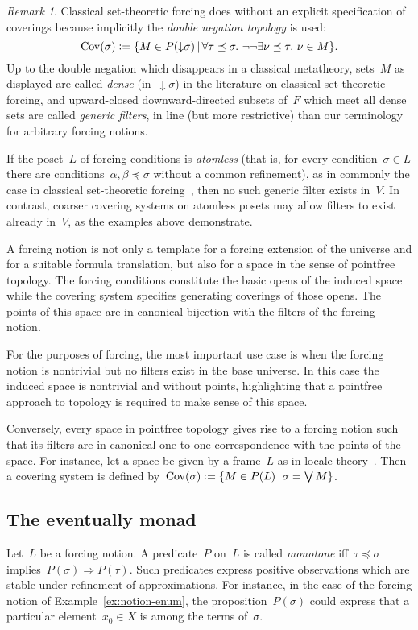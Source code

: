 \documentclass[com,11pt,crcready]{iosart2x}
\theoremstyle{definition}
\theoremstyle{plain}
\theoremstyle{remark}
\newtheorem{remark}[definition]{Remark}
\newcommand{\?}{\,{:}\,}
\newcommand{\defeq}{\vcentcolon=}
\newcommand{\Cov}{\mathrm{Cov}}
\renewcommand{\_}{\mathpunct{.}\,}
\begin{document}
\begin{remark}Classical set-theoretic forcing
does without an explicit specification of coverings because implicitly the
\emph{double negation topology} is used:
\[ \Cov(\sigma) \defeq \{ M \in P({\downarrow}\sigma) \,|\,
  \forall \tau \preceq \sigma\_ \neg\neg \exists \nu \preceq \tau\_ \nu \in M
  \}. \]
Up to the double negation which disappears in a classical metatheory, sets~$M$ as displayed are called
\emph{dense} (in~${\downarrow}\sigma$) in the literature on classical set-theoretic forcing, and
upward-closed downward-directed subsets of~$F$ which meet all dense sets are
called \emph{generic filters}, in line (but more restrictive) than our
terminology for arbitrary forcing notions.

If the poset~$L$ of forcing conditions is \emph{atomless} (that is, for every
condition~$\sigma \in L$ there are conditions~$\alpha,\beta \preceq \sigma$
without a common refinement), as in commonly the case in classical
set-theoretic forcing~\cite[Lemma~1.33]{schilhan:bsc}, then no such generic filter exists in~$V$.
In contrast, coarser covering systems on atomless posets may allow
filters to exist already in~$V$, as the examples above demonstrate.
\end{remark}

A forcing notion is not only a template for a forcing extension of the universe and
for a suitable formula translation, but also for a space in the sense of
pointfree topology. The forcing conditions constitute the basic opens of the
induced space while the covering system specifies generating coverings of
those opens. The points of this space are in canonical bijection with the
filters of the forcing notion.

For the purposes of forcing, the most important use case is when the forcing
notion is nontrivial but no filters exist in the base universe. In this case
the induced space is nontrivial and without points, highlighting that a
pointfree approach to topology is required to make sense of this space.

Conversely, every space in pointfree topology gives rise to a forcing notion such that its
filters are in canonical one-to-one correspondence with the points of the space.
For instance, let a space be given by a frame~$L$ as in locale
theory~\cite{picado-pultr:frames-and-locales}. Then a covering system is
defined by~$\Cov(\sigma) \defeq \{ M \in P(L) \,|\, \sigma = \bigvee M \}$.


\subsection{The eventually monad} Let~$L$ be a forcing notion. A
predicate~$P$ on~$L$ is called \emph{monotone} iff~$\tau \preceq \sigma$
implies~$P(\sigma) \Rightarrow P(\tau)$. Such predicates express positive
observations which are stable under refinement of approximations. For
instance, in the case of the forcing notion of Example~\ref{ex:notion-enum},
the proposition~$P(\sigma)$ could express that a particular element~$x_0 \in X$
is among the terms of~$\sigma$.
\end{document}
